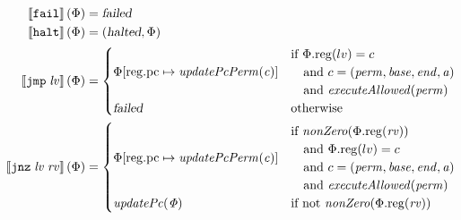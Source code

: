 \documentclass{article}
\newcommand{\update}[2]{[#1 \mapsto #2]}
\newcommand{\sem}[1]{\left\llbracket #1 \right\rrbracket}
\newcommand{\var}[1]{\mathit{#1}}
\newcommand{\rv}{\var{rv}}
\newcommand{\lv}{\var{lv}}
\newcommand{\pcreg}{\mathrm{pc}}
\newcommand{\addr}{\var{a}}
\newcommand{\start}{\var{base}}
\newcommand{\addrend}{\var{end}}
\newcommand{\perm}{\var{perm}}
\newcommand{\plainproj}[1]{\mathrm{#1}}
\newcommand{\memreg}[1][\Phi]{#1.\plainproj{reg}}
\newcommand{\updateReg}[3][\Phi]{#1\update{\plainproj{reg}.#2}{#3}}
\newcommand{\failed}{\textsl{failed}}
\newcommand{\halted}{\textsl{halted}}
\newcommand{\plainfun}[1]{\mathit{#1}}
\newcommand{\updatePcPerm}[1]{\plainfun{updatePcPerm}(#1)}
\newcommand{\executeAllowed}[1]{\plainfun{executeAllowed}(#1)}
\newcommand{\nonZero}[1]{\plainfun{nonZero}(#1)}
\newcommand{\stdUpdatePc}[1]{\plainfun{updatePc(#1)}}
\newcommand{\fail}{\instr{fail}}
\newcommand{\halt}{\instr{halt}}
\newcommand{\instr}[1]{\mathtt{#1}}
\newcommand{\oneinstr}[2]{\instr{#1} \; #2}
\newcommand{\jmp}[1]{\oneinstr{jmp}{#1}}
\newcommand{\twoinstr}[3]{\instr{#1} \; #2 \; #3}
\newcommand{\jnz}[2]{\twoinstr{jnz}{#1}{#2}}
\begin{document}
\begin{align*}
  \sem{\fail}(\Phi)                        & = \failed \\
  \sem{\halt}(\Phi)                        & = (\halted,\Phi) \\
  \sem{\jmp{\lv}}(\Phi)                    & = 
                                             \begin{cases}
                                               \updateReg{\pcreg}{\updatePcPerm{\var{c}}} &
                                               \arraycolsep=0pt
                                               \begin{array}{l}
                                                 \text{if }\memreg(lv) = c \\
                                                 \quad\text{and }c=(\perm,\start,\addrend,\addr)\\
                                                 \quad\text{and }\executeAllowed{\perm}
                                               \end{array} \\
                                               \failed                              & \text{otherwise }
                                             \end{cases} \\
  \sem{\jnz{\lv}{\rv}}(\Phi)               & = 
                                             \begin{cases}
                                               \updateReg{\pcreg}{\updatePcPerm{\var{c}}} &
                                               \arraycolsep=0pt
                                               \begin{array}{l}
                                                 \text{if $\nonZero{\memreg(\rv)}$} \\ 
                                                 \quad\text{and $\memreg(lv) = c$} \\
                                                 \quad\text{and $c=(\perm,\start,\addrend,\addr)$}\\
                                                 \quad\text{and $\executeAllowed{\perm}$}
                                               \end{array}
                                               \\ %
                                               \stdUpdatePc{\Phi} & \text{if not $\nonZero{\memreg(\rv)}$}\\

\end{cases}
\end{align*}
\end{document}

